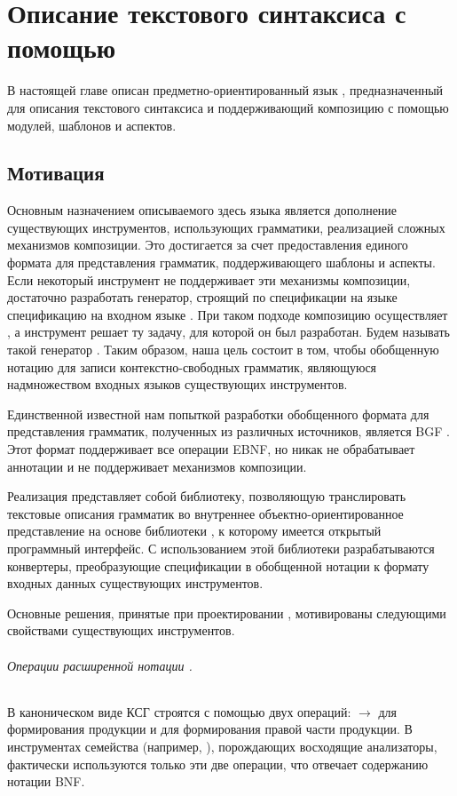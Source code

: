 \part{Описание текстового синтаксиса с помощью }

В настоящей главе описан предметно-ориентированный язык \GRM{}, предназначенный для описания текстового синтаксиса и поддерживающий композицию с помощью модулей, шаблонов и аспектов. 

\chapter{Мотивация}

Основным назначением описываемого здесь языка является дополнение существующих инструментов, использующих грамматики, реализацией сложных механизмов композиции. Это достигается за счет предоставления единого формата для представления грамматик, поддерживающего шаблоны и аспекты. Если некоторый инструмент  не поддерживает эти механизмы композиции, достаточно разработать генератор, строящий по спецификации на языке \GRM{} спецификацию на входном языке . При таком подходе композицию осуществляет \GRM{}, а инструмент  решает ту задачу, для которой он был разработан. Будем называть такой генератор . Таким образом, наша цель состоит в том, чтобы обобщенную нотацию для записи контекстно-свободных грамматик, являющуюся надмножеством входных языков существующих инструментов.

Единственной известной нам попыткой разработки обобщенного формата для представления грамматик, полученных из различных источников, является BGF \cite{RecoverJLS}. Этот формат поддерживает все операции EBNF, но никак не обрабатывает аннотации и не поддерживает механизмов композиции.

Реализация \GRM{} представляет собой библиотеку, позволяющую транслировать текстовые описания грамматик во внутреннее объектно-ориентированное представление на основе библиотеки  \cite{EMF}, к которому имеется открытый программный интерфейс. С использованием этой библиотеки разрабатываются конвертеры, преобразующие спецификации в обобщенной нотации к формату входных данных существующих инструментов.

Основные решения, принятые при проектировании \GRM{}, мотивированы следующими свойствами существующих инструментов.

\paragraph*{Операции расширенной нотации .}
В каноническом виде КСГ строятся с помощью двух операций: $\rightarrow$ для формирования продукции и  для формирования правой части продукции. В инструментах семейства  (например, \cite{YACC}), порождающих восходящие анализаторы, фактически используются только эти две операции, что отвечает содержанию нотации BNF.

